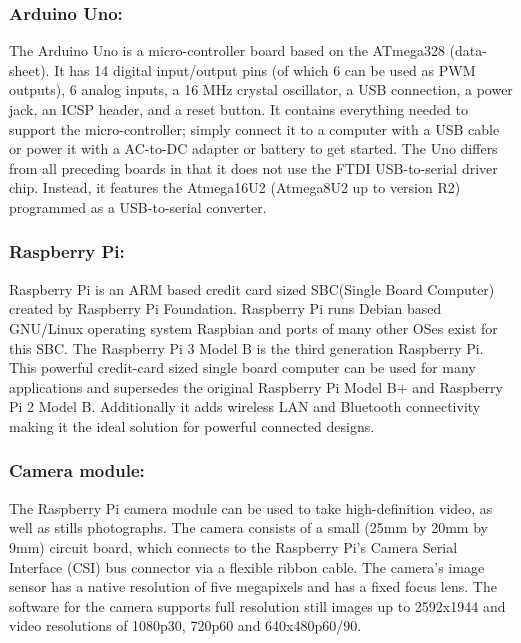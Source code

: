 \documentclass[12pt]{article}
\begin{document}
\subsubsection{Arduino Uno:}
{\quad}The Arduino Uno is a micro-controller board based on the ATmega328 (data-sheet). It has 14 digital input/output pins (of which 6 can be used as PWM outputs), 6 analog inputs, a 16 MHz crystal oscillator, a USB connection, a power jack, an ICSP header, and a reset button. It contains everything needed to support the micro-controller; simply connect it to a computer with a USB cable or power it with a AC-to-DC adapter or battery to get started.
The Uno differs from all preceding boards in that it does not use the FTDI USB-to-serial driver chip. Instead, it features the Atmega16U2 (Atmega8U2 up to version R2) programmed as a USB-to-serial converter.

\subsubsection{Raspberry Pi:}
{\quad}Raspberry Pi is an ARM based credit card sized SBC(Single Board Computer) created by Raspberry Pi Foundation. Raspberry Pi runs Debian based GNU/Linux operating system Raspbian and ports of many other OSes exist for this SBC.
The Raspberry Pi 3 Model B is the third generation Raspberry Pi. This powerful credit-card sized single board computer can be used for many applications and supersedes the original Raspberry Pi Model B+ and Raspberry Pi 2 Model B.
Additionally it adds wireless LAN and Bluetooth connectivity making it the ideal solution for powerful connected designs.

\subsubsection{Camera module:}
{\quad}The Raspberry Pi camera module can be used to take high-definition video, as well as stills photographs. The camera consists of a small (25mm by 20mm by 9mm) circuit board, which connects to the Raspberry Pi's Camera Serial Interface (CSI) bus connector via a flexible ribbon cable. The camera's image sensor has a native resolution of five megapixels and has a fixed focus lens. The software for the camera supports full resolution still images up to 2592x1944 and video resolutions of 1080p30, 720p60 and 640x480p60/90.
\newpage
\end{document}
